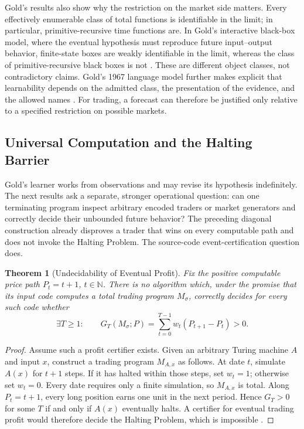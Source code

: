\documentclass[aps,pra,reprint,superscriptaddress,amsmath,amssymb,floatfix]{revtex4-2}
\theoremstyle{plain}
\newtheorem{theorem}{Theorem}
\theoremstyle{definition}
\theoremstyle{remark}
\begin{document}
Gold's results also show why the restriction on the market side matters. Every
effectively enumerable class of total functions is identifiable in the limit;
in particular, primitive-recursive time functions are. In Gold's interactive
black-box model, where the eventual hypothesis must reproduce future
input--output behavior, finite-state boxes are weakly identifiable in the
limit, whereas the class of primitive-recursive black boxes is not
\cite{go-65}. These are different object classes, not contradictory claims.
Gold's 1967 language model further makes explicit that learnability depends on
the admitted class, the presentation of the evidence, and the allowed names
\cite{go-67}. For trading, a forecast can therefore be justified only relative
to a specified restriction on possible markets.

\subsection{Universal Computation and the Halting Barrier}

Gold's learner works from observations and may revise its hypothesis
indefinitely. The next results ask a separate, stronger operational question:
can one terminating program inspect arbitrary encoded traders or market
generators and correctly decide their unbounded future behavior? The preceding
diagonal construction already disproves a trader that wins on every computable
path and does not invoke the Halting Problem. The source-code
event-certification question does.

\begin{theorem}[Undecidability of Eventual Profit]
  \label{thm:profit-undecidable}
  Fix the positive computable price path \(P_t=t+1\), \(t\in\mathbb{N}\).
  There is no algorithm which, under the promise that its input code computes
  a total trading program \(M_\sigma\), correctly decides for every such code
  whether
  \[
    \exists T\geq1:\qquad
    G_T(M_\sigma;P)=
    \sum_{t=0}^{T-1}w_t(P_{t+1}-P_t)>0.
  \]
\end{theorem}

\begin{proof}
Assume such a profit certifier exists. Given an arbitrary Turing machine
\(A\) and input \(x\), construct a trading program \(M_{A,x}\) as follows.
At date \(t\), simulate \(A(x)\) for \(t+1\) steps. If it has halted within
those steps, set \(w_t=1\); otherwise set \(w_t=0\). Every date requires only
a finite simulation, so \(M_{A,x}\) is total. Along \(P_t=t+1\), every long
position earns one unit in the next period. Hence \(G_T>0\) for some \(T\) if
and only if \(A(x)\) eventually halts. A certifier for eventual trading profit
would therefore decide the Halting Problem, which is impossible
\cite{turing-36}.
\end{proof}
\end{document}
